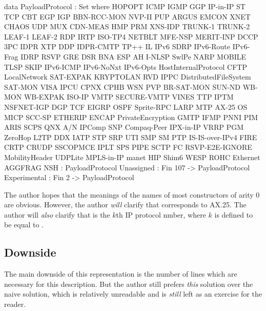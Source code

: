 \documentclass{report}
\begin{document}
\begin{code}
  data PayloadProtocol : Set
    where
    HOPOPT
     ICMP
     IGMP
     GGP
     IP-in-IP
     ST
     TCP
     CBT
     EGP
     IGP
     BBN-RCC-MON
     NVP-II
     PUP
     ARGUS
     EMCON
     XNET
     CHAOS
     UDP
     MUX
     CDN-MEAS
     HMP
     PRM
     XNS-IDP
     TRUNK-1
     TRUNK-2
     LEAF-1
     LEAF-2
     RDP
     IRTP
     ISO-TP4
     NETBLT
     MFE-NSP
     MERIT-INP
     DCCP
     3PC
     IDPR
     XTP
     DDP
     IDPR-CMTP
     TP++
     IL
     IPv6
     SDRP
     IPv6-Route
     IPv6-Frag
     IDRP
     RSVP
     GRE
     DSR
     BNA
     ESP
     AH
     I-NLSP
     SwlPe
     NARP
     MOBILE
     TLSP
     SKIP
     IPv6-ICMP
     IPv6-NoNxt
     IPv6-Opts
     HostInternalProtocol
     CFTP
     LocalNetwork
     SAT-EXPAK
     KRYPTOLAN
     RVD
     IPPC
     DistributedFileSystem
     SAT-MON
     VISA
     IPCU
     CPNX
     CPHB
     WSN
     PVP
     BR-SAT-MON
     SUN-ND
     WB-MON
     WB-EXPAK
     ISO-IP
     VMTP
     SECURE-VMTP
     VINES
     TTP
     IPTM
     NSFNET-IGP
     DGP
     TCF
     EIGRP
     OSPF
     Sprite-RPC
     LARP
     MTP
     AX-25
     OS
     MICP
     SCC-SP
     ETHERIP
     ENCAP
     PrivateEncryption
     GMTP
     IFMP
     PNNI
     PIM
     ARIS
     SCPS
     QNX
     A/N
     IPComp
     SNP
     Compaq-Peer
     IPX-in-IP
     VRRP
     PGM
     ZeroHop
     L2TP
     DDX
     IATP
     STP
     SRP
     UTI
     SMP
     SM
     PTP
     IS-IS-over-IPv4
     FIRE
     CRTP
     CRUDP
     SSCOPMCE
     IPLT
     SPS
     PIPE
     SCTP
     FC
     RSVP-E2E-IGNORE
     MobilityHeader
     UDPLite
     MPLS-in-IP
     manet
     HIP
     Shim6
     WESP
     ROHC
     Ethernet
     AGGFRAG
     NSH : PayloadProtocol
    Unassigned : Fin 107 -> PayloadProtocol
    Experimental : Fin 2 -> PayloadProtocol
\end{code}

The author hopes that the meanings of the names of most constructors of arity 0 are obvious.  However, the author \emph{will} clarify that  corresponds to AX.25.  The author will \emph{also} clarify that   is the \(k\)th IP protocol nmber, where \(k\) is defined to be equal to  \AgdaOperator{\AgdaFunction{+}}  .

\subsection{Downside}
The main downside of this representation is the number of lines which are necessary for this description.  But the author still prefers \emph{this} solution over the naive solution, which is relatively unreadable and is \emph{still} left as an exercise for the reader.
\end{document}
